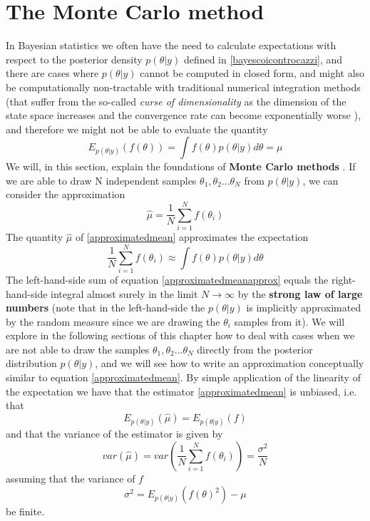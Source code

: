 \documentclass[12pt,mythesisstyle]{report}
\begin{document}
\section{The Monte Carlo method}\label{section: monteCarloMethods}
In Bayesian statistics we often have the need to calculate expectations with respect to the posterior density $p(\theta | y)$ defined in \eqref{bayescoicontrocazzi}, and there are cases where  $p(\theta | y)$  cannot be computed in closed form, and might also be computationally non-tractable with traditional numerical integration methods (that suffer from the so-called \textit{curse of dimensionality} as the dimension of the state space increases and the convergence rate can become exponentially worse \cite{curseOfDimensionality}), and therefore we might not be able to evaluate the quantity
\begin{equation}\label{expectationposterior}
E_{p(\theta | y)}(f(\theta))=\int f(\theta)p(\theta | y)d\theta=\mu
\end{equation} 
We will, in this section, explain the foundations of \textbf{Monte Carlo methods} \cite{montecarlomethodsbib} \cite{RobertCasella}. If we are able to draw N independent samples $\theta_1,\theta_2...\theta_N$ from $p(\theta | y)$, we can consider the approximation
\begin{equation}\label{approximatedmean}
\hat{\mu}=\frac{1}{N}\sum_{i=1}^{N}f(\theta_i)
\end{equation}
The quantity $\hat{\mu}$ of \eqref{approximatedmean} approximates the expectation
\begin{equation}\label{approximatedmeanapprox}
\frac{1}{N}\sum_{i=1}^{N}f(\theta_i)\approx \int f(\theta)p(\theta | y)d\theta
\end{equation}
The left-hand-side sum of equation \eqref{approximatedmeanapprox} equals the right-hand-side integral almost surely in the limit $N \xrightarrow{}\infty$ by the \textbf{strong law of large numbers} (note that in the left-hand-side the $p(\theta | y)$ is implicitly approximated by the random measure since we are drawing the $\theta_i$ samples from it). We will explore in the following sections of this chapter how to deal with cases when we are not able to draw the samples $\theta_1,\theta_2...\theta_N$ directly from the posterior distribution $p(\theta | y)$, and we will see how to write an approximation conceptually similar to equation \eqref{approximatedmean}.
By simple application of the linearity of the expectation we have that the estimator \eqref{approximatedmean} is unbiased, i.e. that
\begin{equation}\label{unbiased_p}
E_{p(\theta | y)}(\hat{\mu})=E_{p(\theta | y)}(f)
\end{equation}
 and that the variance of the estimator is given by
\begin{equation}
var(\hat{\mu})=var(\frac{1}{N}\sum_{i=1}^{N}f(\theta_i))=\frac{\sigma^2}{N}
\end{equation}
assuming that the variance of $f$
\begin{equation}
\sigma^2=E_{p(\theta | y)}(f(\theta)^2)-\mu
\end{equation}
be finite.
\end{document}
